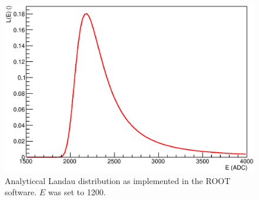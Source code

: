 	\begin{figure}[H]
	\centering
		\includegraphics[width = 0.9 \textwidth]{graphics/cosmicRays/TMathLandauRoot.eps}
		\caption[Landau Distribution]{Analyticcal Landau distribution as implemented in the ROOT software. $\hat E$ was set to 1200.}
		\label{fig:Introduction:landauDistribution}
	\end{figure}

    
   
